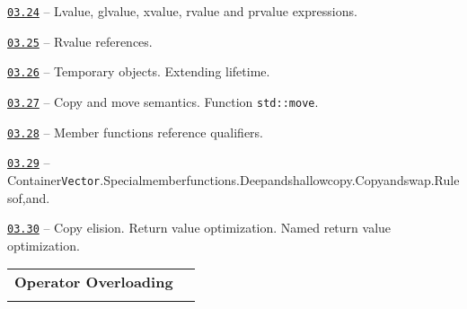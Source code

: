 \documentclass[a4paper,12pt]{article}
\renewenvironment{itemize}
{
    \begin{list}{\labelitemi}
    {
      \setlength{\topsep}{0pt}
      \setlength{\partopsep}{0pt}
      \setlength{\parskip}{0pt}
      \setlength{\itemsep}{0pt}
      \setlength{\parsep}{0pt}
      \setlength{\leftmargin}{14.5pt}
    }
}{\end{list}}
\begin{document}
\begin{itemize}

    \item \href{https://github.com/i-s-m-mipt/Education/blob/master/projects/examples/source/03.24.pdf}{\texttt{03.24}} -- Lvalue, glvalue, xvalue, rvalue and prvalue expressions.

    \smallskip

    \item \href{https://github.com/i-s-m-mipt/Education/blob/master/projects/examples/source/03.25.cpp}{\texttt{03.25}} -- Rvalue references.

    \smallskip

    \item \href{https://github.com/i-s-m-mipt/Education/blob/master/projects/examples/source/03.26.cpp}{\texttt{03.26}} -- Temporary objects. Extending lifetime.

    \smallskip

    \item \href{https://github.com/i-s-m-mipt/Education/blob/master/projects/examples/source/03.27.cpp}{\texttt{03.27}} -- Copy and move semantics. Function \lstinline{std::move}.

    \smallskip

    \item \href{https://github.com/i-s-m-mipt/Education/blob/master/projects/examples/source/03.28.cpp}{\texttt{03.28}} -- Member functions reference qualifiers.

    \smallskip

    \item \href{https://github.com/i-s-m-mipt/Education/blob/master/projects/examples/source/03.29.cpp}{\texttt{03.29}} -- Container\:\lstinline{Vector}.\:Special\:member\:functions.\:Deep\:and\:shallow\:copy.\:Copy\:and\:swap.\:Rules\:of,\:and.

    \smallskip

    \item \href{https://github.com/i-s-m-mipt/Education/blob/master/projects/examples/source/03.30.cpp}{\texttt{03.30}} -- Copy elision. Return value optimization. Named return value optimization.

\end{itemize}

\bigskip\medskip

\begin{tabular}{!{\vrule width 1pt}L{4.3cm}!{\vrule width 1pt}L{14.7cm}!{\vrule width 0pt}} 


\textbf{Operator Overloading} & \\


\end{tabular}
\end{document}
